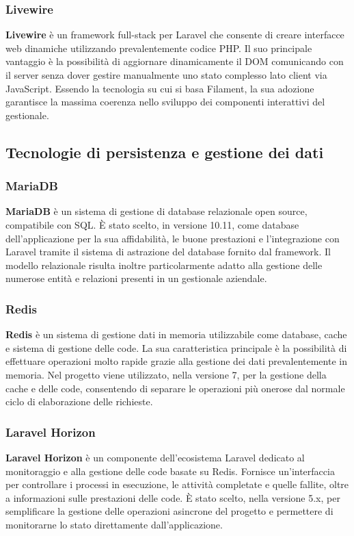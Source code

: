 \subsubsection{Livewire}
\textbf{Livewire} è un framework full-stack per Laravel che consente di creare interfacce web dinamiche utilizzando prevalentemente codice PHP. Il suo principale 
vantaggio è la possibilità di aggiornare dinamicamente il DOM comunicando con il server senza dover gestire manualmente uno stato complesso lato client via JavaScript. 
Essendo la tecnologia su cui si basa Filament, la sua adozione garantisce la massima coerenza nello sviluppo dei componenti interattivi del gestionale.

\subsection{Tecnologie di persistenza e gestione dei dati}
\subsubsection{MariaDB}
\textbf{MariaDB} è un sistema di gestione di database relazionale open source, compatibile con SQL. È stato scelto, in versione 10.11, come database dell'applicazione per la sua affidabilità, 
le buone prestazioni e l'integrazione con Laravel tramite il sistema di astrazione del database fornito dal framework. Il modello relazionale risulta inoltre particolarmente 
adatto alla gestione delle numerose entità e relazioni presenti in un gestionale aziendale.

\subsubsection{Redis}
\textbf{Redis} è un sistema di gestione dati in memoria utilizzabile come database, cache e sistema di gestione delle code. La sua caratteristica principale è la possibilità di 
effettuare operazioni molto rapide grazie alla gestione dei dati prevalentemente in memoria. Nel progetto viene utilizzato, nella versione 7, per la gestione della cache e delle code, consentendo 
di separare le operazioni più onerose dal normale ciclo di elaborazione delle richieste.

\subsubsection{Laravel Horizon}
\textbf{Laravel Horizon} è un componente dell'ecosistema Laravel dedicato al monitoraggio e alla gestione delle code basate su Redis. Fornisce un'interfaccia per controllare i 
processi in esecuzione, le attività completate e quelle fallite, oltre a informazioni sulle prestazioni delle code. È stato scelto, nella versione 5.x, per semplificare la gestione delle operazioni 
asincrone del progetto e permettere di monitorarne lo stato direttamente dall'applicazione.

